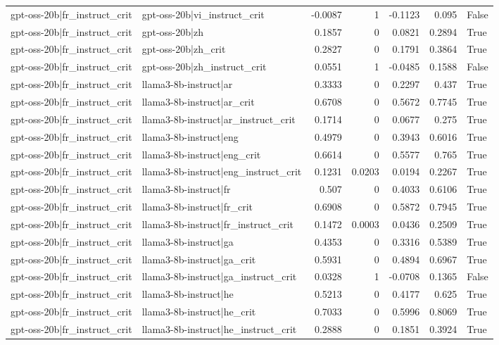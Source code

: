 \begin{table}
\begin{tabular}{l l r r r r l}
gpt-oss-20b|fr_instruct_crit & gpt-oss-20b|vi_instruct_crit & -0.0087 & 1 & -0.1123 & 0.095 & False \\
gpt-oss-20b|fr_instruct_crit & gpt-oss-20b|zh & 0.1857 & 0 & 0.0821 & 0.2894 & True \\
gpt-oss-20b|fr_instruct_crit & gpt-oss-20b|zh_crit & 0.2827 & 0 & 0.1791 & 0.3864 & True \\
gpt-oss-20b|fr_instruct_crit & gpt-oss-20b|zh_instruct_crit & 0.0551 & 1 & -0.0485 & 0.1588 & False \\
gpt-oss-20b|fr_instruct_crit & llama3-8b-instruct|ar & 0.3333 & 0 & 0.2297 & 0.437 & True \\
gpt-oss-20b|fr_instruct_crit & llama3-8b-instruct|ar_crit & 0.6708 & 0 & 0.5672 & 0.7745 & True \\
gpt-oss-20b|fr_instruct_crit & llama3-8b-instruct|ar_instruct_crit & 0.1714 & 0 & 0.0677 & 0.275 & True \\
gpt-oss-20b|fr_instruct_crit & llama3-8b-instruct|eng & 0.4979 & 0 & 0.3943 & 0.6016 & True \\
gpt-oss-20b|fr_instruct_crit & llama3-8b-instruct|eng_crit & 0.6614 & 0 & 0.5577 & 0.765 & True \\
gpt-oss-20b|fr_instruct_crit & llama3-8b-instruct|eng_instruct_crit & 0.1231 & 0.0203 & 0.0194 & 0.2267 & True \\
gpt-oss-20b|fr_instruct_crit & llama3-8b-instruct|fr & 0.507 & 0 & 0.4033 & 0.6106 & True \\
gpt-oss-20b|fr_instruct_crit & llama3-8b-instruct|fr_crit & 0.6908 & 0 & 0.5872 & 0.7945 & True \\
gpt-oss-20b|fr_instruct_crit & llama3-8b-instruct|fr_instruct_crit & 0.1472 & 0.0003 & 0.0436 & 0.2509 & True \\
gpt-oss-20b|fr_instruct_crit & llama3-8b-instruct|ga & 0.4353 & 0 & 0.3316 & 0.5389 & True \\
gpt-oss-20b|fr_instruct_crit & llama3-8b-instruct|ga_crit & 0.5931 & 0 & 0.4894 & 0.6967 & True \\
gpt-oss-20b|fr_instruct_crit & llama3-8b-instruct|ga_instruct_crit & 0.0328 & 1 & -0.0708 & 0.1365 & False \\
gpt-oss-20b|fr_instruct_crit & llama3-8b-instruct|he & 0.5213 & 0 & 0.4177 & 0.625 & True \\
gpt-oss-20b|fr_instruct_crit & llama3-8b-instruct|he_crit & 0.7033 & 0 & 0.5996 & 0.8069 & True \\
gpt-oss-20b|fr_instruct_crit & llama3-8b-instruct|he_instruct_crit & 0.2888 & 0 & 0.1851 & 0.3924 & True \\

\end{tabular}
\end{table}

